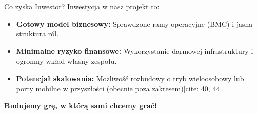 \documentclass[10pt]{beamer}
\begin{document}
\begin{frame}{Co zyska Inwestor?}
    Inwestycja w nasz projekt to:
    \begin{itemize}
        \item \textbf{Gotowy model biznesowy:} Sprawdzone ramy operacyjne (BMC) i jasna struktura ról.
        \item \textbf{Minimalne ryzyko finansowe:} Wykorzystanie darmowej infrastruktury i ogromny wkład własny zespołu.
        \item \textbf{Potencjał skalowania:} Możliwość rozbudowy o tryb wieloosobowy lub porty mobilne w przyszłości (obecnie poza zakresem)[cite: 40, 44].
    \end{itemize}
    \vspace{0.3cm}
    \centering \large \textbf{Budujemy grę, w którą sami chcemy grać!}
\end{frame}
\end{document}
